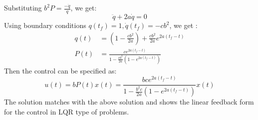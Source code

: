 \begin{enumerate}
  Substituting $b^2 P = \frac{-\dot q}{q}$, we get:
  \begin{equation*}
   \ddot q + 2a \dot q = 0
  \end{equation*}
  Using boundary conditions $q(t_f) = 1, \dot q(t_f) = -c b^2$, we get :
  \begin{align*}
   q(t) &= \left(1 - \frac{cb^2}{2a}\right)  + \frac{c b^2}{2a} e^{2a(t_f - t)}\\
   P(t) &=  \frac{c e^{2a(t_f - t)}}{1 - \frac{cb^2}{2a}\left(1 - e^{2a(t_f - t)}\right)}
  \end{align*}
  Then the control can be specified as:
  \begin{equation*}
   u(t) = bP(t) x(t) = \frac{bc e^{2a(t_f - t)}}{1 - \frac{b^2c}{2a}\left(1 - e^{2a(t_f - t)}\right)} x(t)
  \end{equation*}
  The solution matches with the above solution and shows the linear feedback form for the control in LQR type of problems.






\end{enumerate}
